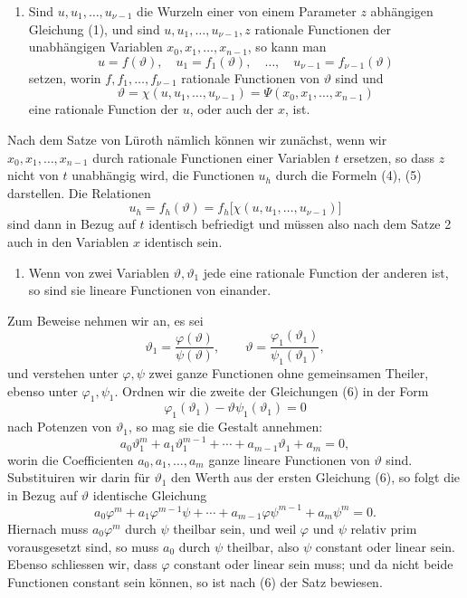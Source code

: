 \documentclass[11pt]{article}
\begin{document}
\begin{enumerate}[label=\arabic*.,start=3]
\item Sind \(u,u_1,\ldots,u_{\nu-1}\) die Wurzeln einer von einem Parameter \(z\) abhängigen Gleichung (1), und sind \(u,u_1,\ldots,u_{\nu-1},z\) rationale Functionen der unabhängigen Variablen \(x_0,x_1,\ldots,x_{n-1}\), so kann man
\begin{equation}
u=f(\vartheta),\quad u_1=f_1(\vartheta),\quad\ldots,\quad u_{\nu-1}=f_{\nu-1}(\vartheta)
\tag{4}
\end{equation}
setzen, worin \(f,f_1,\ldots,f_{\nu-1}\) rationale Functionen von \(\vartheta\) sind und
\begin{equation}
\vartheta=\chi(u,u_1,\ldots,u_{\nu-1})
=\Psi(x_0,x_1,\ldots,x_{n-1})
\tag{5}
\end{equation}
eine rationale Function der \(u\), oder auch der \(x\), ist.
\end{enumerate}

Nach dem Satze von Lüroth nämlich können wir zunächst, wenn wir \(x_0,x_1,\ldots,x_{n-1}\) durch rationale Functionen einer Variablen \(t\) ersetzen, so dass \(z\) nicht von \(t\) unabhängig wird, die Functionen \(u_h\) durch die Formeln (4), (5) darstellen. Die Relationen
\[
u_h=f_h(\vartheta)=f_h\bigl[\chi(u,u_1,\ldots,u_{\nu-1})\bigr]
\]
sind dann in Bezug auf \(t\) identisch befriedigt und müssen also nach dem Satze 2 auch in den Variablen \(x\) identisch sein.

\begin{enumerate}[label=\arabic*.,start=4]
\item Wenn von zwei Variablen \(\vartheta,\vartheta_1\) jede eine rationale Function der anderen ist, so sind sie lineare Functionen von einander.
\end{enumerate}

Zum Beweise nehmen wir an, es sei
\begin{equation}
\vartheta_1=\frac{\varphi(\vartheta)}{\psi(\vartheta)},
\qquad
\vartheta=\frac{\varphi_1(\vartheta_1)}{\psi_1(\vartheta_1)},
\tag{6}
\end{equation}
und verstehen unter \(\varphi,\psi\) zwei ganze Functionen ohne gemeinsamen Theiler, ebenso unter \(\varphi_1,\psi_1\). Ordnen wir die zweite der Gleichungen (6) in der Form
\[
\varphi_1(\vartheta_1)-\vartheta\psi_1(\vartheta_1)=0
\]
nach Potenzen von \(\vartheta_1\), so mag sie die Gestalt annehmen:
\[
a_0\vartheta_1^m+a_1\vartheta_1^{m-1}+\cdots+a_{m-1}\vartheta_1+a_m=0,
\]
worin die Coefficienten \(a_0,a_1,\ldots,a_m\) ganze lineare Functionen von \(\vartheta\) sind. Substituiren wir darin für \(\vartheta_1\) den Werth aus der ersten Gleichung (6), so folgt die in Bezug auf \(\vartheta\) identische Gleichung
\[
a_0\varphi^m+a_1\varphi^{m-1}\psi+\cdots+a_{m-1}\varphi\psi^{m-1}+a_m\psi^m=0.
\]
Hiernach muss \(a_0\varphi^m\) durch \(\psi\) theilbar sein, und weil \(\varphi\) und \(\psi\) relativ prim vorausgesetzt sind, so muss \(a_0\) durch \(\psi\) theilbar, also \(\psi\) constant oder linear sein. Ebenso schliessen wir, dass \(\varphi\) constant oder linear sein muss; und da nicht beide Functionen constant sein können, so ist nach (6) der Satz bewiesen.
\end{document}
